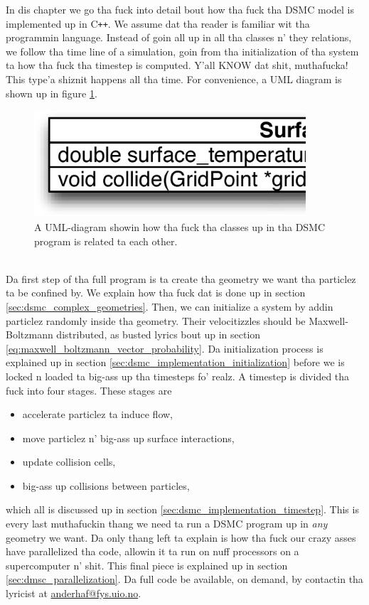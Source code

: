 In dis chapter we go tha fuck into detail bout how tha fuck tha DSMC model is implemented up in C{}\verb!++!. We assume dat tha reader is familiar wit tha programmin language. Instead of goin all up in all tha classes n' they relations, we follow tha time line of a simulation, goin from tha initialization of tha system ta how tha fuck tha timestep is computed. Y'all KNOW dat shit, muthafucka! This type'a shiznit happens all tha time. For convenience, a UML diagram is shown up in figure \ref{fig:dsmc_uml_diagram}.
\begin{figure}[h]
\begin{center}
\includegraphics[width=0.9\textwidth, trim=0cm 0cm 0cm 0cm, clip]{DSMC/figures/dsmcuml.eps}
\end{center}
\caption{A UML-diagram showin how tha fuck tha classes up in tha DSMC program is related ta each other.}
\label{fig:dsmc_uml_diagram}
\end{figure}
\\
Da first step of tha full program is ta create tha geometry we want tha particlez ta be confined by. We explain how tha fuck dat is done up in section \ref{sec:dsmc_complex_geometries}. Then, we can initialize a system by addin particlez randomly inside tha geometry. Their velocitizzles should be Maxwell-Boltzmann distributed, as busted lyrics bout up in section \ref{eq:maxwell_boltzmann_vector_probability}. Da initialization process is explained up in section \ref{sec:dsmc_implementation_initialization} before we is locked n loaded ta big-ass up tha timesteps fo' realz. A timestep is divided tha fuck into four stages. These stages are
\begin{itemize}
    \item accelerate particlez ta induce flow,
    \item move particlez n' big-ass up surface interactions,
    \item update collision cells,
    \item big-ass up collisions between particles,
\end{itemize}
which all is discussed up in section \ref{sec:dsmc_implementation_timestep}. This is every last muthafuckin thang we need ta run a DSMC program up in \textit{any} geometry we want. Da only thang left ta explain is how tha fuck our crazy asses have parallelized tha code, allowin it ta run on nuff processors on a supercomputer n' shit. This final piece is explained up in section \ref{sec:dmsc_parallelization}. Da full code be available, on demand, by contactin tha lyricist at \url{anderhaf@fys.uio.no}.